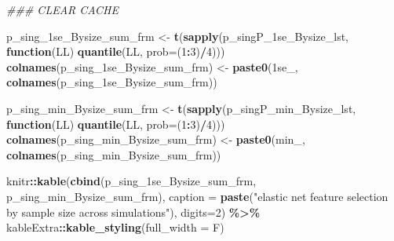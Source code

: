 \documentclass[
]{book}
\newenvironment{Shaded}{\begin{snugshade}}{\end{snugshade}}
\newcommand{\CommentTok}[1]{\textcolor[rgb]{0.56,0.35,0.01}{\textit{#1}}}
\newcommand{\ControlFlowTok}[1]{\textcolor[rgb]{0.13,0.29,0.53}{\textbf{#1}}}
\newcommand{\DataTypeTok}[1]{\textcolor[rgb]{0.13,0.29,0.53}{#1}}
\newcommand{\DecValTok}[1]{\textcolor[rgb]{0.00,0.00,0.81}{#1}}
\newcommand{\KeywordTok}[1]{\textcolor[rgb]{0.13,0.29,0.53}{\textbf{#1}}}
\newcommand{\NormalTok}[1]{#1}
\newcommand{\OperatorTok}[1]{\textcolor[rgb]{0.81,0.36,0.00}{\textbf{#1}}}
\newcommand{\StringTok}[1]{\textcolor[rgb]{0.31,0.60,0.02}{#1}}
\begin{document}
\begin{Shaded}
\begin{Highlighting}[]
\CommentTok{\#\#\# CLEAR CACHE}

\NormalTok{p\_sing\_1se\_Bysize\_sum\_frm <{-}}\StringTok{ }\KeywordTok{t}\NormalTok{(}\KeywordTok{sapply}\NormalTok{(p\_singP\_1se\_Bysize\_lst, }\ControlFlowTok{function}\NormalTok{(LL) }\KeywordTok{quantile}\NormalTok{(LL, }\DataTypeTok{prob=}\NormalTok{(}\DecValTok{1}\OperatorTok{:}\DecValTok{3}\NormalTok{)}\OperatorTok{/}\DecValTok{4}\NormalTok{)))}
\KeywordTok{colnames}\NormalTok{(p\_sing\_1se\_Bysize\_sum\_frm) <{-}}\StringTok{ }\KeywordTok{paste0}\NormalTok{(}\StringTok{\textquotesingle{}1se\_\textquotesingle{}}\NormalTok{, }\KeywordTok{colnames}\NormalTok{(p\_sing\_1se\_Bysize\_sum\_frm))}

\NormalTok{p\_sing\_min\_Bysize\_sum\_frm <{-}}\StringTok{ }\KeywordTok{t}\NormalTok{(}\KeywordTok{sapply}\NormalTok{(p\_singP\_min\_Bysize\_lst, }\ControlFlowTok{function}\NormalTok{(LL) }\KeywordTok{quantile}\NormalTok{(LL, }\DataTypeTok{prob=}\NormalTok{(}\DecValTok{1}\OperatorTok{:}\DecValTok{3}\NormalTok{)}\OperatorTok{/}\DecValTok{4}\NormalTok{)))}
\KeywordTok{colnames}\NormalTok{(p\_sing\_min\_Bysize\_sum\_frm) <{-}}\StringTok{ }\KeywordTok{paste0}\NormalTok{(}\StringTok{\textquotesingle{}min\_\textquotesingle{}}\NormalTok{, }\KeywordTok{colnames}\NormalTok{(p\_sing\_min\_Bysize\_sum\_frm))}

\NormalTok{knitr}\OperatorTok{::}\KeywordTok{kable}\NormalTok{(}\KeywordTok{cbind}\NormalTok{(p\_sing\_1se\_Bysize\_sum\_frm, p\_sing\_min\_Bysize\_sum\_frm),}
    \DataTypeTok{caption =} \KeywordTok{paste}\NormalTok{(}\StringTok{"elastic net feature selection by sample size across simulations"}\NormalTok{),}
    \DataTypeTok{digits=}\DecValTok{2}\NormalTok{) }\OperatorTok{\%>\%}
\StringTok{   }\NormalTok{kableExtra}\OperatorTok{::}\KeywordTok{kable\_styling}\NormalTok{(}\DataTypeTok{full\_width =}\NormalTok{ F)}
\end{Highlighting}
\end{Shaded}
\end{document}
